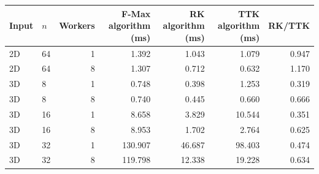 \begin{tabular}{llrrrrr}
\hline
Input & $n$ & Workers & F-Max algorithm (ms) & RK algorithm (ms) & TTK algorithm (ms) & RK/TTK \\
\hline
2D & 64 & 1 & 1.392 & 1.043 & 1.079 & 0.947 \\
2D & 64 & 8 & 1.307 & 0.712 & 0.632 & 1.170 \\
3D & 8 & 1 & 0.748 & 0.398 & 1.253 & 0.319 \\
3D & 8 & 8 & 0.740 & 0.445 & 0.660 & 0.666 \\
3D & 16 & 1 & 8.658 & 3.829 & 10.544 & 0.351 \\
3D & 16 & 8 & 8.953 & 1.702 & 2.764 & 0.625 \\
3D & 32 & 1 & 130.907 & 46.687 & 98.403 & 0.474 \\
3D & 32 & 8 & 119.798 & 12.338 & 19.228 & 0.634 \\
\hline
\end{tabular}
